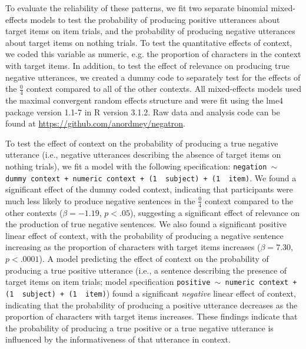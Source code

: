 \documentclass[man, noapacite]{apa2}
\begin{document}
To evaluate the reliability of these patterns, we fit two separate binomial mixed-effects models to test the probability of producing positive utterances about target items on item trials, and the probability of producing negative utterances about target items on nothing trials. To test the quantitative effects of context, we coded this variable as numeric, e.g. the proportion of characters in the context with target items. In addition, to test the effect of relevance on producing true negative utterances, we created a dummy code to separately test for the effects of the  $\frac{0}{4}$ context compared to all of the other contexts.  All mixed-effects models used the maximal convergent random effects structure and were fit using the lme4 package version 1.1-7 in R version 3.1.2. Raw data and analysis code can be found at \url{https://github.com/anordmey/negatron}.

To test the effect of context on the probability of producing a true negative utterance (i.e., negative utterances describing the absence of target items on nothing trials), we fit a model with the following specification: \texttt{negation $\sim$  dummy context + numeric context + (1~\textbar~subject) +  (1~\textbar~item)}. We  found a significant effect of the dummy coded context, indicating that participants were much less likely to produce negative sentences in the $\frac{0}{4}$ context compared to the other contexts ($\beta= -1.19$, $p< .05$), suggesting a significant effect of relevance on the production of true negative sentences. We also found a significant positive linear effect of context, with the probability of producing a negative sentence increasing as the proportion of characters with target items increases ($\beta= 7.30$, $p< .0001$). A model predicting the effect of context on the probability of producing a true positive utterance (i.e., a sentence describing the presence of target items on item trials; model specification \texttt{positive $\sim$  numeric context + (1~\textbar~subject) +  (1~\textbar~item)}) found a significant \emph{negative} linear effect of context, indicating that the probability of producing a positive utterance decreases as the proportion of characters with target items increases. These findings indicate that the probability of producing a true positive or a true negative utterance is influenced by the informativeness of that utterance in context.
\end{document}

